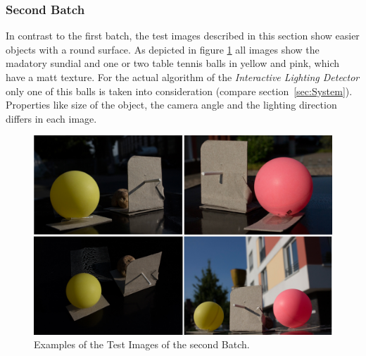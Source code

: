 \subsubsection{Second Batch} \label{sec:testimagessecond}
In contrast to the first batch, the test images described in this section show easier objects with a round surface. As depicted in figure \ref{fig:batch2} all images show the madatory sundial and one or two table tennis balls in yellow and pink, which have a matt texture. For the actual algorithm of the \textit{Interactive Lighting Detector} only one of this balls is taken into consideration (compare section~\ref{sec:System}). Properties like size of the object, the camera angle and the lighting direction differs in each image.

\begin{figure}[H] 
	\center 
	\includegraphics[width=12cm]{Images/batch2.jpg}			
	\caption[Examples of the Test Images of the second Batch.]{Examples of the Test Images of the second Batch.}
	\label{fig:batch2}
\end{figure}

\newpage
